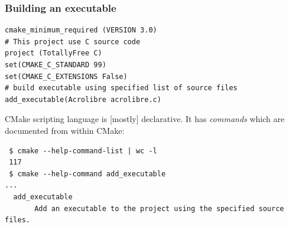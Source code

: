 \documentclass[compress,slidestop,table
              ]
               {beamer}
\begin{document}
\begin{frame}[fragile]
\frametitle{Building an executable}
\begin{lstlisting}[basicstyle=\scriptsize,caption=Building a simple program]
cmake_minimum_required (VERSION 3.0)
# This project use C source code
project (TotallyFree C)
set(CMAKE_C_STANDARD 99)
set(CMAKE_C_EXTENSIONS False)
# build executable using specified list of source files
add_executable(Acrolibre acrolibre.c)
\end{lstlisting}
CMake scripting language is [mostly] declarative.
It has \emph{commands} which are documented from within CMake:
{\tiny
\begin{verbatim}
 $ cmake --help-command-list | wc -l 
 117
 $ cmake --help-command add_executable
...
  add_executable
       Add an executable to the project using the specified source files.
\end{verbatim}
}
\end{frame}
\end{document}
